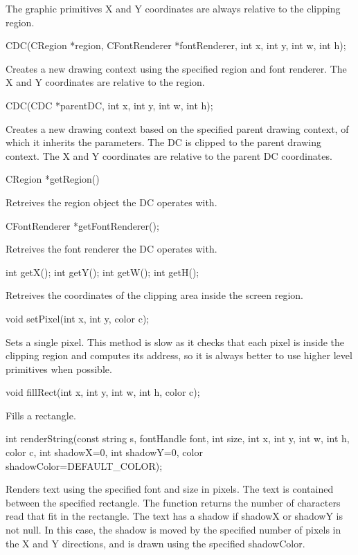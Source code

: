 \documentclass[a4paper,11pt]{journal}
\begin{document}
The graphic primitives X and Y coordinates are always relative to the clipping region.\\
\begin{verbatimtab}CDC(CRegion *region, CFontRenderer *fontRenderer, int x, int y, int w, int h);\end{verbatimtab}
Creates a new drawing context using the specified region and font renderer. The X and Y coordinates are relative to the region.\\
\begin{verbatimtab}CDC(CDC *parentDC, int x, int y, int w, int h);\end{verbatimtab}
Creates a new drawing context based on the specified parent drawing context, of which it inherits the parameters. The DC is clipped to the parent drawing context. The X and Y coordinates are relative to the parent DC coordinates.\\
\begin{verbatimtab}CRegion *getRegion()\end{verbatimtab}
Retreives the region object the DC operates with.\\
\begin{verbatimtab}CFontRenderer *getFontRenderer();\end{verbatimtab}
Retreives the font renderer the DC operates with.\\
\begin{verbatimtab}
int getX();
int getY();
int getW();
int getH();
\end{verbatimtab}
Retreives the coordinates of the clipping area inside the screen region.\\
\begin{verbatimtab}void setPixel(int x, int y, color c);\end{verbatimtab}
Sets a single pixel. This method is slow as it checks that each pixel is inside the clipping region and computes its address, so it is always better to use higher level primitives when possible.\\
\begin{verbatimtab}void fillRect(int x, int y, int w, int h, color c);\end{verbatimtab}
Fills a rectangle.\\
\begin{verbatimtab}
int renderString(const string s, fontHandle font, int size, int x, int y, int w,
int h, color c, int shadowX=0, int shadowY=0, color shadowColor=DEFAULT_COLOR);
\end{verbatimtab}
Renders text using the specified font and size in pixels. The text is contained between the specified rectangle. The function returns the number of characters read that fit in the rectangle. The text has a shadow if shadowX or shadowY is not null. In this case, the shadow is moved by the specified number of pixels in the X and Y directions, and is drawn using the specified shadowColor.\\
\end{document}
